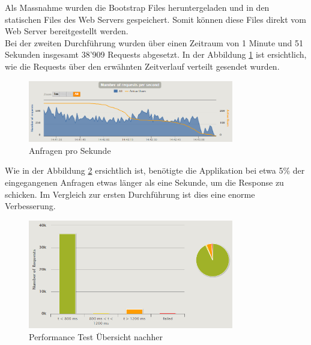 Als Massnahme wurden die Bootstrap Files heruntergeladen und in den statischen Files des Web Servers gespeichert. Somit können diese Files direkt vom Web Server bereitgestellt werden. \\

Bei der zweiten Durchführung wurden über einen Zeitraum von 1 Minute und 51 Sekunden insgesamt 38'909 Requests abgesetzt. In der Abbildung \ref{request_per_second} ist ersichtlich, wie die Requests über den erwähnten Zeitverlauf verteilt gesendet wurden.

	\begin{figure}[H]
		\begin{center}		
		\includegraphics[width=0.8\textwidth, height=\textheight, keepaspectratio]{images/performance_requests_per_second.png}
		\caption{Anfragen pro Sekunde}
			\label{request_per_second}
	\end{center}
	\end{figure}

Wie in der Abbildung \ref{performance_tests} ersichtlich ist, benötigte die Applikation bei etwa 5\% der eingegangenen Anfragen etwas länger als eine Sekunde, um die Response zu schicken. Im Vergleich zur ersten Durchführung ist dies eine enorme Verbesserung.

	\begin{figure}[H]
		\begin{center}
		\includegraphics[width=0.8\textwidth, height=\textheight, keepaspectratio]{images/performance_uebersicht.png}
		\caption{Performance Test Übersicht nachher}
			\label{performance_tests}
	\end{center}
	\end{figure}



